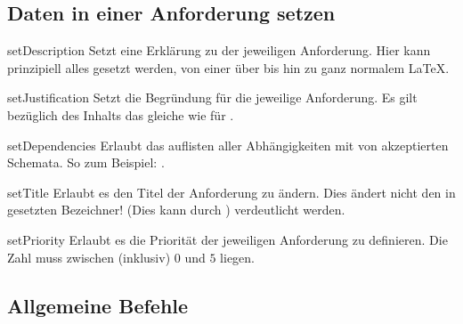 \documentclass{sopra-base}
\begin{document}
\subsection{Daten in einer Anforderung setzen}

 

\begin{command}{setDescription}{}
    Setzt eine Erklärung zu der jeweiligen Anforderung. Hier kann prinzipiell alles gesetzt werden, von einer  über  bis hin zu ganz normalem LaTeX.
\end{command}

\begin{command}{setJustification}{}
    Setzt die Begründung für die jeweilige Anforderung. Es gilt bezüglich des Inhalts das gleiche wie für .
\end{command}

\begin{command}{setDependencies}{}
    Erlaubt das auflisten aller Abhängigkeiten mit von  akzeptierten Schemata. So zum Beispiel: .
\end{command}

\begin{command}{setTitle}{}
    Erlaubt es den Titel der Anforderung zu ändern. Dies ändert nicht den in  gesetzten Bezeichner! (Dies kann durch ) verdeutlicht werden. 
\end{command}


\begin{command}{setPriority}{}
    Erlaubt es die Priorität der jeweiligen Anforderung zu definieren. Die Zahl muss zwischen (inklusiv) \(0\) und \(5\) liegen.
\end{command}

\subsection{Allgemeine Befehle}
\end{document}
